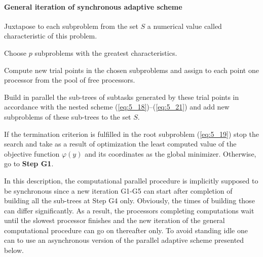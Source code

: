 \paragraph{\textbf{General iteration of synchronous adaptive scheme}}
\begin{description} 
\item [\textbf{Step G1.}] {Juxtapose to each subproblem from the set $S$  a numerical value called characteristic of this problem.}
\item [\textbf{Step G2.}] {Choose $p$ subproblems with the greatest characteristics.}
\item [\textbf{Step G3.}]{Compute new trial points in the chosen subproblems and assign to each point one processor from the pool of free processors.}
\item [\textbf{Step G4.}]{Build in parallel the sub-trees of subtasks generated by these trial points in accordance with the nested scheme (\ref{eq:5_18})--(\ref{eq:5_21}) and add new subproblems of these sub-trees to the set $S$.}
\item [\textbf{Step G5.}]{If the termination  criterion is fulfilled in the root subproblem (\ref{eq:5_19}) stop the search and take as a result of optimization the least computed value of the objective function $\varphi(y)$ and its coordinates as the global minimizer. Otherwise, go to  \textbf{Step G1}.}
\end{description}

In this description, the computational parallel procedure is implicitly supposed to be synchronous since a new iteration G1-G5 can start after completion of  building all the sub-trees at Step G4 only.  Obviously, the times of building those can differ significantly. As a result, the processors completing computations wait until the slowest processor finishes and the new iteration of the general computational procedure can go on thereafter only. To avoid standing idle one can to use an asynchronous version of the parallel adaptive scheme presented below.


